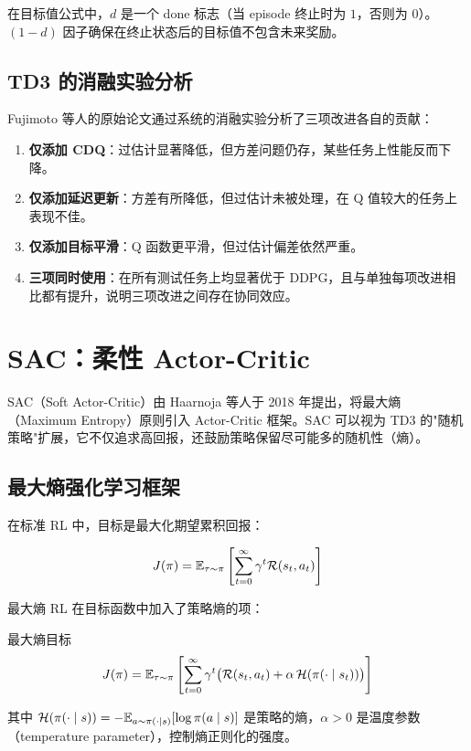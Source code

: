 \begin{remark}
在目标值公式中，$d$ 是一个 done 标志（当 episode 终止时为 $1$，否则为 $0$）。$(1-d)$ 因子确保在终止状态后的目标值不包含未来奖励。
\end{remark}

\subsection{TD3 的消融实验分析}

Fujimoto 等人的原始论文通过系统的消融实验分析了三项改进各自的贡献：

\begin{enumerate}
    \item \textbf{仅添加 CDQ}：过估计显著降低，但方差问题仍存，某些任务上性能反而下降。
    \item \textbf{仅添加延迟更新}：方差有所降低，但过估计未被处理，在 Q 值较大的任务上表现不佳。
    \item \textbf{仅添加目标平滑}：Q 函数更平滑，但过估计偏差依然严重。
    \item \textbf{三项同时使用}：在所有测试任务上均显著优于 DDPG，且与单独每项改进相比都有提升，说明三项改进之间存在协同效应。
\end{enumerate}

\section{SAC：柔性 Actor-Critic}

SAC（Soft Actor-Critic）由 Haarnoja 等人于 2018 年提出，将最大熵（Maximum Entropy）原则引入 Actor-Critic 框架。SAC 可以视为 TD3 的"随机策略"扩展，它不仅追求高回报，还鼓励策略保留尽可能多的随机性（熵）。

\subsection{最大熵强化学习框架}

在标准 RL 中，目标是最大化期望累积回报：

\[
J(\pi) = \mathbb{E}_{\tau \sim \pi} \left[ \sum_{t=0}^{\infty} \gamma^t \mathcal{R}(s_t, a_t) \right]
\]

最大熵 RL 在目标函数中加入了策略熵的项：

\begin{mydefinition}{最大熵目标}
\[
J(\pi) = \mathbb{E}_{\tau \sim \pi} \left[ \sum_{t=0}^{\infty} \gamma^t \big( \mathcal{R}(s_t, a_t) + \alpha \, \mathcal{H}(\pi(\cdot \mid s_t)) \big) \right]
\]

其中 $\mathcal{H}(\pi(\cdot \mid s)) = -\mathbb{E}_{a \sim \pi(\cdot \mid s)}[\log \pi(a \mid s)]$ 是策略的熵，$\alpha > 0$ 是温度参数（temperature parameter），控制熵正则化的强度。
\end{mydefinition}

